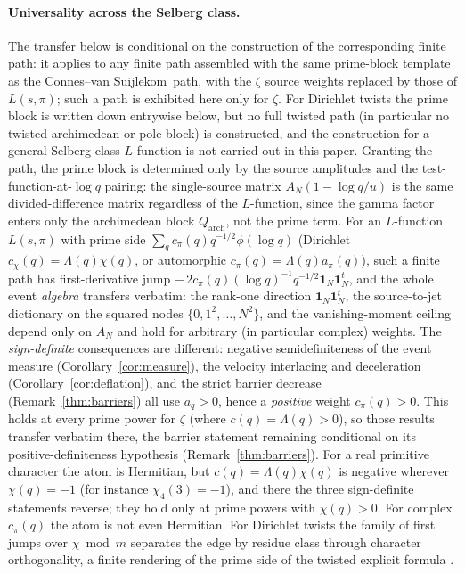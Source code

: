 \documentclass[11pt]{article}
\theoremstyle{plain}
\theoremstyle{definition}
\theoremstyle{remark}
\newcommand{\cvs}{Connes--van Suijlekom}
\newcommand{\one}{\mathbf 1}
\newcommand{\Lam}{\Lambda}
\begin{document}
\paragraph{Universality across the Selberg class.}
The transfer below is conditional on the construction of the corresponding
finite path: it applies to any finite path assembled with the same prime-block
template as the \cvs\ path, with the $\zeta$ source weights replaced by those of
$L(s,\pi)$; such a path is exhibited here only for $\zeta$. For Dirichlet
twists the prime block is written down entrywise below, but no full twisted
path (in particular no twisted archimedean or pole block) is constructed, and
the construction for a general Selberg-class $L$-function
is not carried out in this paper. Granting the path, the prime block is
determined only by the source amplitudes and the
test-function-at-$\log q$ pairing: the single-source matrix $A_N(1-\log q/u)$ is
the same divided-difference matrix regardless of the $L$-function, since the
gamma factor enters only the archimedean block $Q_{\mathrm{arch}}$, not the prime
term. For an $L$-function $L(s,\pi)$ with prime side
$\sum_q c_\pi(q)q^{-1/2}\phi(\log q)$
(Dirichlet $c_\chi(q)=\Lam(q)\chi(q)$, or automorphic $c_\pi(q)=\Lam(q)a_\pi(q)$),
such a finite path has first-derivative jump
$-\,2c_\pi(q)(\log q)^{-1}q^{-1/2}\one_N\one_N^t$, and the whole event
\emph{algebra} transfers verbatim: the rank-one direction $\one_N\one_N^t$, the
source-to-jet dictionary on the squared nodes $\{0,1^2,\dots,N^2\}$, and the
vanishing-moment ceiling depend only on $A_N$ and hold for arbitrary (in particular
complex) weights. The \emph{sign-definite} consequences are different: negative
semidefiniteness of the event measure (Corollary~\ref{cor:measure}), the velocity
interlacing and deceleration (Corollary~\ref{cor:deflation}), and the strict
barrier decrease (Remark~\ref{thm:barriers}) all use $a_q>0$, hence a
\emph{positive} weight $c_\pi(q)>0$. This holds at every prime power for $\zeta$
(where $c(q)=\Lam(q)>0$), so those results transfer verbatim there, the barrier
statement remaining conditional on its positive-definiteness hypothesis
(Remark~\ref{thm:barriers}). For a real
primitive character the atom is Hermitian, but $c(q)=\Lam(q)\chi(q)$ is negative
wherever $\chi(q)=-1$ (for instance $\chi_4(3)=-1$), and there the three
sign-definite statements reverse; they hold only at prime powers with
$\chi(q)>0$. For complex $c_\pi(q)$ the atom is not even Hermitian. For Dirichlet twists the family of first jumps over
$\chi\bmod m$ separates the edge by residue class through character orthogonality,
a finite rendering of the prime side of the twisted explicit formula
\cite{IwaniecKowalski2004}.
\end{document}
